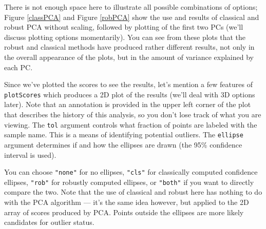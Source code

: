 \documentclass[letter,10pt,twocolumn,twoside,printwatermark=false]{pinp}
\begin{document}
There is not enough space here to illustrate all possible combinations
of options; Figure \ref{classPCA} and Figure \ref{robPCA} show the use
and results of classical and robust PCA without scaling, followed by
plotting of the first two PCs (we'll discuss plotting options
momentarily). You can see from these plots that the robust and classical
methods have produced rather different results, not only in the overall
appearance of the plots, but in the amount of variance explained by each
PC.

Since we've plotted the scores to see the results, let's mention a few
features of \texttt{plotScores} which produces a 2D plot of the results
(we'll deal with 3D options later). Note that an annotation is provided
in the upper left corner of the plot that describes the history of this
analysis, so you don't lose track of what you are viewing. The
\texttt{tol} argument controls what fraction of points are labeled with
the sample name. This is a means of identifying potential outliers. The
\texttt{ellipse} argument determines if and how the ellipses are drawn
(the 95\% confidence interval is used).

You can choose \texttt{"none"} for no ellipses, \texttt{"cls"} for
classically computed confidence ellipses, \texttt{"rob"} for robustly
computed ellipses, or \texttt{"both"} if you want to directly compare
the two. Note that the use of classical and robust here has nothing to
do with the PCA algorithm --- it's the same idea however, but applied to
the 2D array of scores produced by PCA. Points outside the ellipses are
more likely candidates for outlier status.

\begin{Shaded}
\begin{Highlighting}[]
\StringTok{ }
   \NormalTok{)}
   \NormalTok{(}\NormalTok{,}\NormalTok{),}
   \NormalTok{,}
   \NormalTok{)}
\end{Highlighting}
\end{Shaded}
\end{document}

